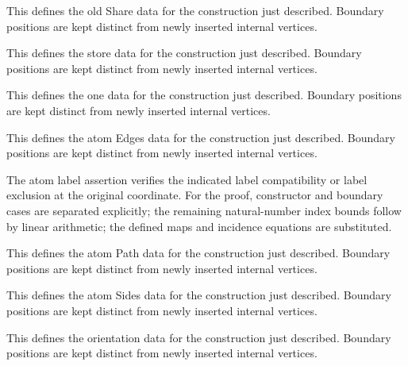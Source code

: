 This defines the old Share data for the construction just described. Boundary positions are kept distinct from newly inserted internal vertices.
\par{}

This defines the store data for the construction just described. Boundary positions are kept distinct from newly inserted internal vertices.
\par{}

This defines the one data for the construction just described. Boundary positions are kept distinct from newly inserted internal vertices.
\par{}

This defines the atom Edges data for the construction just described. Boundary positions are kept distinct from newly inserted internal vertices.
\par{}

The atom label assertion verifies the indicated label compatibility or label exclusion at the original coordinate.
For the proof, constructor and boundary cases are separated explicitly; the remaining natural-number index bounds follow by linear arithmetic; the defined maps and incidence equations are substituted.
\par{}

This defines the atom Path data for the construction just described. Boundary positions are kept distinct from newly inserted internal vertices.
\par{}

This defines the atom Sides data for the construction just described. Boundary positions are kept distinct from newly inserted internal vertices.
\par{}

This defines the orientation data for the construction just described. Boundary positions are kept distinct from newly inserted internal vertices.
\par{}

